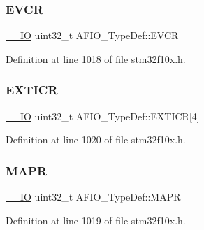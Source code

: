 \subsubsection{\texorpdfstring{E\+V\+CR}{EVCR}}
{\footnotesize\ttfamily \hyperlink{core__sc300_8h_aec43007d9998a0a0e01faede4133d6be}{\+\_\+\+\_\+\+IO} uint32\+\_\+t A\+F\+I\+O\+\_\+\+Type\+Def\+::\+E\+V\+CR}



Definition at line 1018 of file stm32f10x.\+h.

\mbox{\label{struct_a_f_i_o___type_def_a5f590aa12271be60c2f61b0a6d2b8772}} 
\subsubsection{\texorpdfstring{E\+X\+T\+I\+CR}{EXTICR}}
{\footnotesize\ttfamily \hyperlink{core__sc300_8h_aec43007d9998a0a0e01faede4133d6be}{\+\_\+\+\_\+\+IO} uint32\+\_\+t A\+F\+I\+O\+\_\+\+Type\+Def\+::\+E\+X\+T\+I\+CR\mbox{[}4\mbox{]}}



Definition at line 1020 of file stm32f10x.\+h.

\mbox{\label{struct_a_f_i_o___type_def_a2b44ba1a427df7d8c0b254f869b9b463}} 
\subsubsection{\texorpdfstring{M\+A\+PR}{MAPR}}
{\footnotesize\ttfamily \hyperlink{core__sc300_8h_aec43007d9998a0a0e01faede4133d6be}{\+\_\+\+\_\+\+IO} uint32\+\_\+t A\+F\+I\+O\+\_\+\+Type\+Def\+::\+M\+A\+PR}



Definition at line 1019 of file stm32f10x.\+h.

\mbox{\label{struct_a_f_i_o___type_def_a4420b9fe25158ac2e5e32f6ad9d1b6ca}} 
